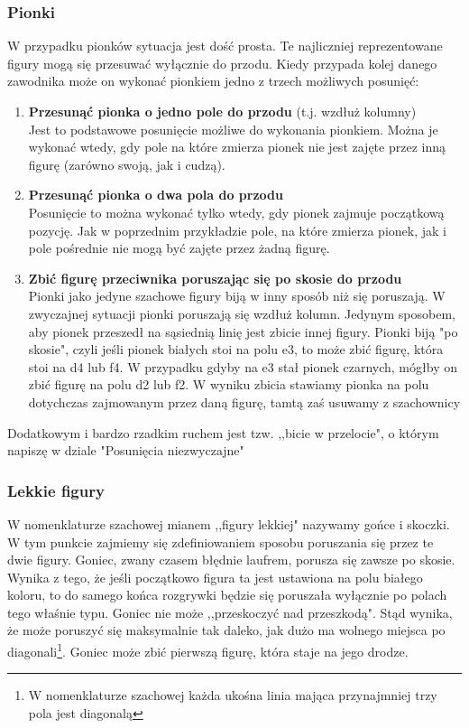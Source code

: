 \documentclass[12pt,leqno]{article}
\begin{document}
\subsubsection{Pionki}
W przypadku pionków sytuacja jest dość prosta. Te najliczniej reprezentowane figury mogą się przesuwać wyłącznie do przodu. Kiedy przypada kolej danego zawodnika może on wykonać pionkiem jedno z trzech możliwych posunięć:
\begin{enumerate}
\item  {\bf Przesunąć pionka o jedno pole do przodu} (t.j. wzdłuż kolumny)\\
Jest to podstawowe posunięcie możliwe do wykonania pionkiem. Można je wykonać wtedy, gdy pole na które zmierza pionek nie jest zajęte przez  inną figurę (zarówno swoją, jak i cudzą).
\item {\bf Przesunąć pionka o dwa pola do przodu}\\
Posunięcie to można wykonać tylko wtedy, gdy pionek zajmuje początkową pozycję.
Jak w poprzednim przykładzie pole, na które zmierza pionek, jak i pole pośrednie nie mogą być zajęte przez żadną figurę.
\item {\bf Zbić figurę przeciwnika poruszając się po skosie do przodu}\\
Pionki jako jedyne szachowe figury biją w inny sposób niż się poruszają. W zwyczajnej sytuacji  pionki poruszają się wzdłuż kolumn. Jedynym sposobem, aby pionek przeszedł na sąsiednią linię jest zbicie innej figury. Pionki biją "po skosie", czyli jeśli  pionek białych stoi na polu e3, to może zbić figurę, która stoi na d4 lub f4. W przypadku gdyby na e3 stał pionek czarnych, mógłby on zbić figurę na polu d2 lub f2. W wyniku zbicia stawiamy pionka na polu dotychczas zajmowanym przez daną figurę, tamtą zaś usuwamy z szachownicy
\end{enumerate}
Dodatkowym i bardzo rzadkim ruchem jest tzw. ,,bicie w przelocie", o którym napiszę w dziale "Posunięcia niezwyczajne"
\subsubsection{Lekkie figury}
W nomenklaturze szachowej mianem ,,figury lekkiej" nazywamy gońce i skoczki. W tym punkcie zajmiemy się zdefiniowaniem sposobu poruszania się przez te dwie figury.  Goniec, zwany czasem błędnie laufrem, porusza się zawsze po skosie. Wynika z tego, że jeśli początkowo figura ta jest ustawiona na polu białego koloru, to do samego końca rozgrywki będzie się poruszała wyłącznie po polach tego właśnie typu. Goniec nie może ,,przeskoczyć nad przeszkodą". Stąd wynika, że może poruszyć się maksymalnie tak daleko, jak dużo ma wolnego miejsca po diagonali\footnote{W nomenklaturze szachowej każda ukośna linia mająca przynajmniej trzy pola jest diagonalą}. Goniec może zbić pierwszą figurę, która staje na jego drodze. \\
\end{document}
